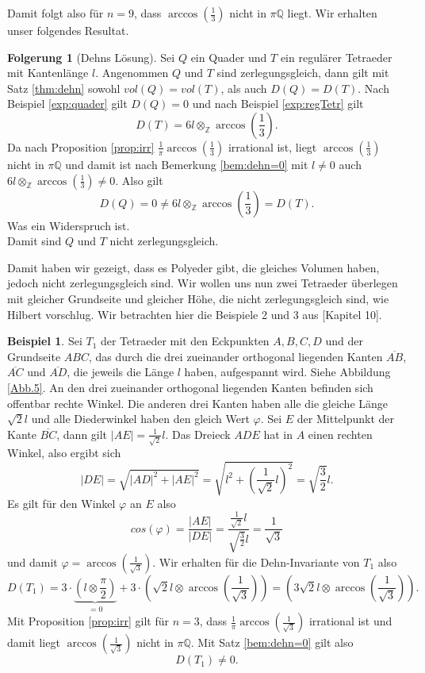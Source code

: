 \documentclass[11pt,titlepage]{article}
\newcommand{\setZ}{\mathbb{Z}}
\newcommand{\setQ}{\mathbb{Q}}
\newcommand{\abs}[1]{{\left| #1 \right|}}
\theoremstyle{definition}
\newtheorem{corollary}[theorem]{Folgerung}
\newtheorem{example}[theorem]{Beispiel}
\theoremstyle{remark}
\begin{document}
	Damit folgt also für $n=9$, dass $\arccos\left(\frac{1}{3}\right)$ nicht in $\pi\setQ$ liegt. Wir erhalten unser 
	folgendes Resultat.
	
	\begin{corollary}[Dehns Lösung]
		Sei $Q$ ein Quader und $T$ ein regulärer Tetraeder mit Kantenlänge $l$. Angenommen 
		$Q$ und $T$ sind zerlegungsgleich, dann gilt mit Satz \ref{thm:dehn} sowohl $vol(Q)=vol(T)$, als auch 
		$D(Q)=D(T)$. 
		Nach Beispiel \ref{exp:quader} gilt $D(Q)=0$ und nach Beispiel \ref{exp:regTetr} gilt
		\[D(T)=6l\otimes_{\setZ}\arccos\left(\frac{1}{3}\right).\]
		Da nach Proposition \ref{prop:irr} $\frac{1}{\pi}\arccos\left(\frac{1}{3}\right)$ irrational ist, liegt
		$\arccos\left(\frac{1}{3}\right)$ nicht in $\pi\setQ$ und damit ist nach Bemerkung \ref{bem:dehn=0} 
		mit $l\neq 0$ auch $6l\otimes_{\setZ}\arccos\left(\frac{1}{3}\right)\neq 0$. Also gilt
		\[ D(Q)=0\neq 6l\otimes_{\setZ}\arccos\left(\frac{1}{3}\right)=D(T).\]
		Was ein Widerspruch ist. \\
		Damit sind $Q$ und $T$ nicht zerlegungsgleich.
	\end{corollary}	
	
	Damit haben wir gezeigt, dass es Polyeder gibt, die gleiches Volumen haben, 
	jedoch nicht zerlegungsgleich sind. Wir wollen uns nun zwei Tetraeder 
	überlegen mit gleicher Grundseite und gleicher Höhe, die nicht 
	zerlegungsgleich sind, wie Hilbert vorschlug. Wir betrachten hier 
	die Beispiele 2 und 3 aus \cite{Proofsfromthebook}[Kapitel 10].
	
	\begin{example}
		Sei $T_1$ der Tetraeder mit den Eckpunkten $A,B,C,D$ und der Grundseite 
		$ABC$, das durch die drei zueinander orthogonal liegenden Kanten 
		$\overline{AB}$, $\overline{AC}$ und $\overline{AD}$, die jeweils 
		die Länge $l$ haben, aufgespannt wird. Siehe 
		Abbildung \ref{Abb.5}. 
		An den drei zueinander orthogonal liegenden Kanten befinden sich 
		offentbar rechte Winkel. Die anderen drei Kanten haben alle 
		die gleiche Länge $\sqrt{2}l$ und alle Diederwinkel 
		haben den gleich Wert $\varphi$. Sei $E$ der Mittelpunkt der Kante 
		$\overline{BC}$, dann gilt $\abs{AE}=\frac{1}{\sqrt{2}}l$. Das 
		Dreieck $ADE$ hat in $A$ einen rechten Winkel, also ergibt sich
		\[\abs{DE}=\sqrt{\abs{AD}^2 +\abs{AE}^2}=\sqrt{l^2 +\left(\frac{1}{\sqrt{2}}l\right)^2}=\sqrt{\frac{3}{2}}l.\]
		Es gilt für den Winkel $\varphi$ an $E$ also
		\[cos(\varphi)=\frac{\abs{AE}}{\abs{DE}}=\frac{\frac{1}{\sqrt{2}}l}{\sqrt{\frac{3}{2}}l}=\frac{1}{\sqrt{3}}\]
		und damit $\varphi=\arccos\left(\frac{1}{\sqrt{3}}\right)$. 
		Wir erhalten für die Dehn-Invariante von $T_1$ also
		\[D(T_1)=3\cdot\underbrace{\left(l\otimes\frac{\pi}{2}\right)}_{=0}+3\cdot\left(\sqrt{2}l\otimes\arccos\left(\frac{1}{\sqrt{3}}\right)\right)=\left(3\sqrt{2}l\otimes\arccos\left(\frac{1}{\sqrt{3}}\right)\right).\]
		Mit Proposition \ref{prop:irr} gilt für $n=3$, dass 
		$\frac{1}{\pi}\arccos\left(\frac{1}{\sqrt{3}}\right)$ irrational ist 
		und damit liegt $\arccos\left(\frac{1}{\sqrt{3}}\right)$ nicht 
		in $\pi\setQ$. Mit Satz \ref{bem:dehn=0} gilt also 
		\[D(T_1)\neq 0.\]
	\end{example}
	
\end{document}
